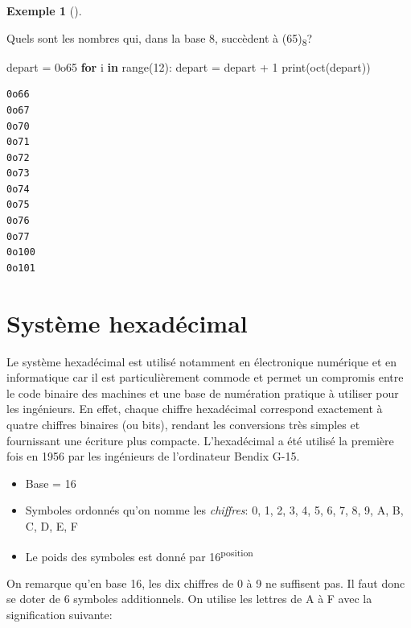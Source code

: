 \documentclass[
  letterpaper,
]{scrbook}
\newenvironment{Shaded}{\begin{snugshade}}{\end{snugshade}}
\newcommand{\BaseNTok}[1]{\textcolor[rgb]{0.25,0.63,0.44}{#1}}
\newcommand{\BuiltInTok}[1]{\textcolor[rgb]{0.00,0.50,0.00}{#1}}
\newcommand{\ControlFlowTok}[1]{\textcolor[rgb]{0.00,0.44,0.13}{\textbf{#1}}}
\newcommand{\DecValTok}[1]{\textcolor[rgb]{0.25,0.63,0.44}{#1}}
\newcommand{\KeywordTok}[1]{\textcolor[rgb]{0.00,0.44,0.13}{\textbf{#1}}}
\newcommand{\NormalTok}[1]{\textcolor[rgb]{0.00,0.44,0.13}{#1}}
\newcommand{\OperatorTok}[1]{\textcolor[rgb]{0.40,0.40,0.40}{#1}}
\providecommand{\tightlist}{%
  \setlength{\itemsep}{0pt}\setlength{\parskip}{0pt}}\usepackage{longtable,booktabs,array}
\theoremstyle{plain}
\theoremstyle{definition}
\theoremstyle{definition}
\newtheorem{example}{Exemple}[chapter]
\theoremstyle{remark}
\begin{document}
\begin{example}[]\protect\hypertarget{exm-nombres-succedent-octal}{}\label{exm-nombres-succedent-octal}

Quels sont les nombres qui, dans la base 8, succèdent à
(65)\textsubscript{8}?

\begin{Shaded}
\begin{Highlighting}[]
\NormalTok{depart }\OperatorTok{=} \BaseNTok{0o65}
\ControlFlowTok{for}\NormalTok{ i }\KeywordTok{in} \BuiltInTok{range}\NormalTok{(}\DecValTok{12}\NormalTok{):}
\NormalTok{    depart }\OperatorTok{=}\NormalTok{ depart }\OperatorTok{+} \DecValTok{1}
    \BuiltInTok{print}\NormalTok{(}\BuiltInTok{oct}\NormalTok{(depart))}
\end{Highlighting}
\end{Shaded}

\begin{verbatim}
0o66
0o67
0o70
0o71
0o72
0o73
0o74
0o75
0o76
0o77
0o100
0o101
\end{verbatim}

\end{example}

\hypertarget{systuxe8me-hexaduxe9cimal}{%
\section{Système hexadécimal}\label{systuxe8me-hexaduxe9cimal}}

Le système hexadécimal est utilisé notamment en électronique numérique
et en informatique car il est particulièrement commode et permet un
compromis entre le code binaire des machines et une base de numération
pratique à utiliser pour les ingénieurs. En effet, chaque chiffre
hexadécimal correspond exactement à quatre chiffres binaires (ou bits),
rendant les conversions très simples et fournissant une écriture plus
compacte. L'hexadécimal a été utilisé la première fois en 1956 par les
ingénieurs de l'ordinateur Bendix G-15.

\begin{itemize}
\tightlist
\item
  Base = 16
\item
  Symboles ordonnés qu'on nomme les \emph{chiffres}: 0, 1, 2, 3, 4, 5,
  6, 7, 8, 9, A, B, C, D, E, F
\item
  Le poids des symboles est donné par 16\textsuperscript{position}
\end{itemize}

On remarque qu'en base 16, les dix chiffres de 0 à 9 ne suffisent pas.
Il faut donc se doter de 6 symboles additionnels. On utilise les lettres
de A à F avec la signification suivante:
\end{document}
